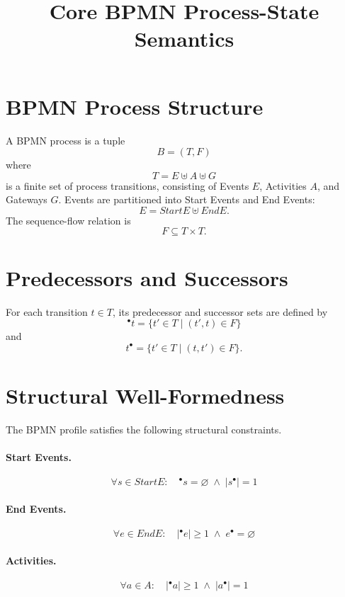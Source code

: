\documentclass[11pt,a4paper]{article}
\title{Core BPMN Process-State Semantics}
\author{}
\date{}
\newcommand{\StartE}{\mathit{StartE}}
\newcommand{\EndE}{\mathit{EndE}}
\begin{document}
\maketitle

\section{BPMN Process Structure}

A BPMN process is a tuple
\[
\boxed{B=(T,F)}
\]
where
\[
\boxed{T=E\uplus A\uplus G}
\]
is a finite set of process transitions, consisting of Events $E$, Activities $A$, and Gateways $G$. Events are partitioned into Start Events and End Events:
\[
\boxed{E=\StartE\uplus\EndE.}
\]
The sequence-flow relation is
\[
\boxed{F\subseteq T\times T.}
\]

\section{Predecessors and Successors}

For each transition $t\in T$, its predecessor and successor sets are defined by
\[
\boxed{{}^{\bullet}t=\{t'\in T\mid (t',t)\in F\}}
\]
and
\[
\boxed{t^{\bullet}=\{t'\in T\mid (t,t')\in F\}.}
\]

\section{Structural Well-Formedness}

The BPMN profile satisfies the following structural constraints.

\paragraph{Start Events.}
\[
\boxed{
\forall s\in\StartE:\quad
{}^{\bullet}s=\varnothing
\;\land\;
|s^{\bullet}|=1
}
\tag{WF-S}
\]

\paragraph{End Events.}
\[
\boxed{
\forall e\in\EndE:\quad
|{}^{\bullet}e|\geq 1
\;\land\;
e^{\bullet}=\varnothing
}
\tag{WF-E}
\]

\paragraph{Activities.}
\[
\boxed{
\forall a\in A:\quad
|{}^{\bullet}a|\geq 1
\;\land\;
|a^{\bullet}|=1
}
\tag{WF-A}
\]
\end{document}
